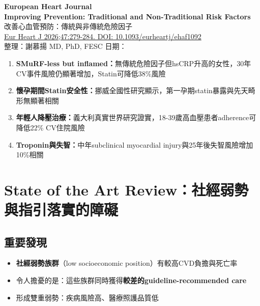 \documentclass[12pt,a4paper]{article}
\begin{document}
\begin{center}
{\LARGE\bfseries\textcolor{emergency_red}{European Heart Journal}}\\[0.5cm]
{\Large\textbf{Improving Prevention: Traditional and Non-Traditional Risk Factors}}\\[0.3cm]
{\large 改善心血管預防：傳統與非傳統危險因子}\\[0.5cm]
{\normalsize \href{https://doi.org/10.1093/eurheartj/ehaf1092}{Eur Heart J 2026;47:279-284. DOI: 10.1093/eurheartj/ehaf1092}}\\[0.3cm]
{\normalsize 整理：謝慕揚 MD, PhD, FESC \quad 日期：\mydate}
\end{center}

\vspace{0.5cm}

\begin{tcolorbox}[colback=yellow!10!white,colframe=orange!75!black,title=\textbf{本期核心重點}]
\begin{enumerate}
    \item \textbf{SMuRF-less but inflamed：}無傳統危險因子但hsCRP升高的女性，30年CV事件風險仍顯著增加，Statin可降低38\%風險
    \item \textbf{懷孕期間Statin安全性：}挪威全國性研究顯示，第一孕期statin暴露與先天畸形無顯著相關
    \item \textbf{年輕人降壓治療：}義大利真實世界研究證實，18-39歲高血壓患者adherence可降低22\% CV住院風險
    \item \textbf{Troponin與失智：}中年subclinical myocardial injury與25年後失智風險增加10\%相關
\end{enumerate}
\end{tcolorbox}

\tableofcontents
\newpage

\section{State of the Art Review：社經弱勢與指引落實的障礙}

\subsection{重要發現}

\begin{itemize}
    \item \textbf{社經弱勢族群}（low socioeconomic position）有較高CVD負擔與死亡率
    \item 令人擔憂的是：這些族群同時獲得\textbf{較差的guideline-recommended care}
    \item 形成雙重弱勢：疾病風險高、醫療照護品質低
\end{itemize}
\end{document}
